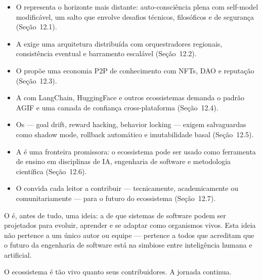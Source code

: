 \begin{itemize}
    \item O  representa o horizonte mais distante:
    auto-consciência plena com self-model modificável, um salto
    que envolve desafios técnicos, filosóficos e de segurança
    (Seção~12.1).
    \item A  exige uma arquitetura
    distribuída com orquestradores regionais, consistência
    eventual e barramento escalável (Seção~12.2).
    \item O  propõe
    uma economia P2P de conhecimento com NFTs, DAO e reputação
    (Seção~12.3).
    \item A  com LangChain, HuggingFace
    e outros ecossistemas demanda o padrão AGIF e uma camada de
    confiança cross-plataforma (Seção~12.4).
    \item Os  --- goal drift,
    reward hacking, behavior locking --- exigem salvaguardas
    como shadow mode, rollback automático e imutabilidade basal
    (Seção~12.5).
    \item A  é uma fronteira promissora: o
    ecossistema pode ser usado como ferramenta de ensino em
    disciplinas de IA, engenharia de software e metodologia
    científica (Seção~12.6).
    \item O  convida cada leitor a
    contribuir --- tecnicamente, academicamente ou
    comunitariamente --- para o futuro do ecossistema
    (Seção~12.7).
\end{itemize}

O \opencodeeco{} é, antes de tudo, uma ideia: a de que sistemas de
software podem ser projetados para evoluir, aprender e se adaptar
como organismos vivos. Esta ideia não pertence a um único autor ou
equipe --- pertence a todos que acreditam que o futuro da engenharia
de software está na simbiose entre inteligência humana e artificial.

O ecossistema é tão vivo quanto seus contribuidores. A jornada
continua.
